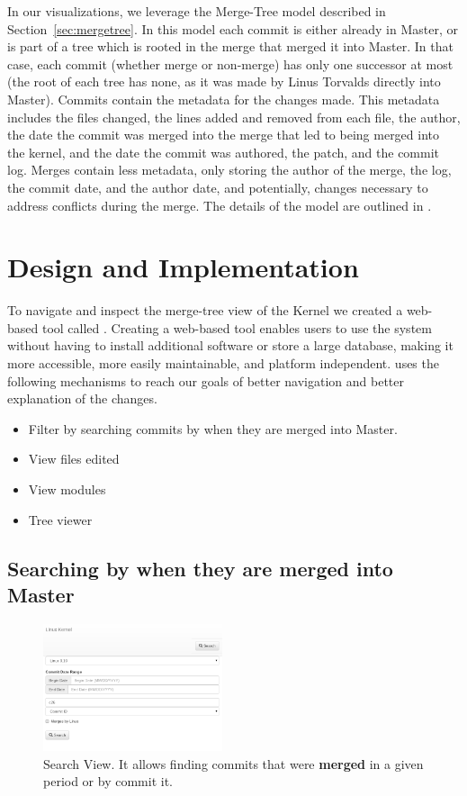 \documentclass[conference, draftclsnofoot, draft]{IEEEtran}
\begin{document}
In our visualizations, we leverage the Merge-Tree model described in Section~\ref{sec:mergetree}. In this model each commit is either already in Master, or is part of a tree which is rooted in the merge that merged it into Master. In that case, each
commit (whether merge or non-merge) has only one successor at most (the root of each tree has none, as it was made by Linus Torvalds directly into Master).
Commits contain the
metadata for the changes made. This metadata includes the files changed, the lines
added and removed from each file, the author, the date the commit was merged into
the merge that led to being merged into the kernel, and the date the commit was
authored, the patch, and the commit log. Merges contain less metadata, only storing
the author of the merge, the log, the commit date, and the author date, and potentially, changes necessary to address conflicts during the merge. The details
of the model are outlined in \cite{German2015}.

\section{Design and Implementation}

To navigate and inspect the merge-tree view of the Kernel we created a web-based
tool called \tool. Creating a web-based tool enables users to use the system without
having to install additional software or store a large database, making it more
accessible, more easily maintainable, and platform independent. \tool uses the
following mechanisms to reach our goals of better navigation and better explanation
of the changes.

\begin{itemize}
        \item Filter by searching commits by when they are merged into Master.
        \item View files edited
        \item View modules
        \item Tree viewer
\end{itemize}


\subsection{Searching by when they are merged into Master}


\begin{figure}
        \centering
        \includegraphics[width=0.47\textwidth]{figures/search.png}
        \caption{Search View. It allows finding commits that were \textbf{merged} in a given period or by commit it.}
        \label{fig:search}
\end{figure}
\end{document}
